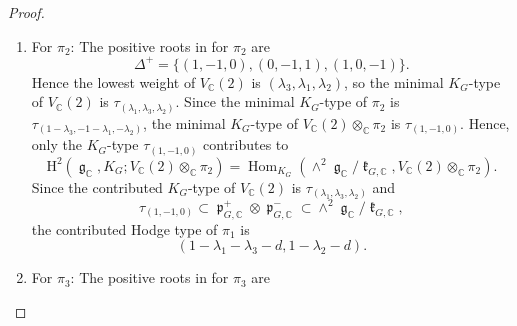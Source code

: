 \documentclass[11pt, a4paper]{amsart}
\theoremstyle{plain}
\theoremstyle{definition}
\numberwithin{equation}{section}
\def\CC{\mathbb{C}}
\DeclareMathOperator{\Hom}{Hom}
\DeclareMathOperator{\lieg}{\mathfrak g}
\DeclareMathOperator{\liek}{\mathfrak k}
\DeclareMathOperator{\liep}{\mathfrak p}
\begin{document}
\begin{proof}
\begin{enumerate}
\begin{equation*}
                               \tau_{(1,1,-2)} \subset \wedge^{2}\liep_{G, \CC}^{+} \subset \wedge^{2} \lieg_{\CC} / \liek_{G, \CC}, 
                           \end{equation*}
                           the contributed Hodge type of $\pi_1$ is 
                           \begin{equation*}
                               (2 - \lambda_2 - \lambda_3 - d, -\lambda_1 - d).
                           \end{equation*}
        \item For $\pi_2$: The positive roots in \cite[Theorem 9.20]{Knapp86} for $\pi_2$ are 
                           \begin{equation*}
                                \Delta^{+} = \{(1, -1, 0), (0, -1, 1), (1, 0, -1) \}. 
                           \end{equation*}
                           Hence the lowest weight of $V_{\CC}(2)$ is $(\lambda_3, \lambda_1, \lambda_2)$, so the minimal $K_{G}$-type of $V_{\CC}(2)$ is $\tau_{(\lambda_1, \lambda_3, \lambda_2)}$. 
                           Since the minimal $K_{G}$-type of $\pi_2$ is $\tau_{(1 - \lambda_3, -1 - \lambda_1,  - \lambda_2)}$, the minimal $K_{G}$-type of 
                           $V_{\CC}(2) \otimes_{\CC} \pi_2$ is $\tau_{(1, -1, 0)}$. Hence, only the $K_{G}$-type $\tau_{(1, -1, 0)}$ contributes to 
                           \begin{equation*}
                               \mathrm{H}^{2}(\lieg_{\CC}, K_{G}; V_{\CC}(2) \otimes_{\CC} \pi_{2}) = \Hom_{K_G}(\wedge^{2} \lieg_{\CC} / \liek_{G, \CC}, V_{\CC}(2) \otimes_{\CC} \pi_{2}). 
                           \end{equation*}
                           Since the contributed $K_{G}$-type of $V_{\CC}(2)$ is $\tau_{(\lambda_1, \lambda_3, \lambda_2)}$ and 
                           \begin{equation*}
                               \tau_{(1,-1,0)} \subset \liep_{G, \CC}^{+} \otimes \liep_{G, \CC}^{-} \subset \wedge^{2} \lieg_{\CC} / \liek_{G, \CC}, 
                           \end{equation*}
                           the contributed Hodge type of $\pi_1$ is 
                           \begin{equation*}
                               (1 - \lambda_1 - \lambda_3 - d, 1 -\lambda_2 - d).
                           \end{equation*}
        \item For $\pi_3$: The positive roots in \cite[Theorem 9.20]{Knapp86} for $\pi_3$ are 

\end{enumerate}
\end{proof}
\end{document}
